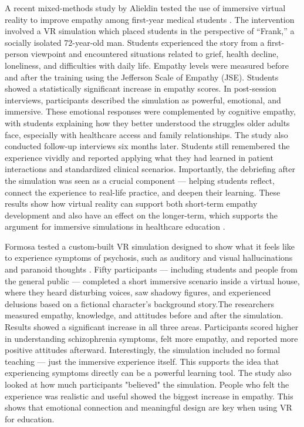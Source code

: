 A recent mixed-methods study by Alieldin \cite{Alieldin2024} tested the use of immersive virtual reality to improve empathy among first-year medical students \cite{Alieldin2024}. The intervention involved a VR simulation which placed students in the perspective of “Frank,” a socially isolated 72-year-old man. Students experienced the story from a first-person viewpoint and encountered situations related to grief, health decline, loneliness, and difficulties with daily life. Empathy levels were measured before and after the training using the Jefferson Scale of Empathy (JSE). Students showed a statistically significant increase in empathy scores. In post-session interviews, participants described the simulation as powerful, emotional, and immersive. These emotional responses were complemented by cognitive empathy, with students explaining how they better understood the struggles older adults face, especially with healthcare access and family relationships. The study also conducted follow-up interviews six months later. Students still remembered the experience vividly and reported applying what they had learned in patient interactions and standardized clinical scenarios. Importantly, the debriefing after the simulation was seen as a crucial component — helping students reflect, connect the experience to real-life practice, and deepen their learning. These results show how virtual reality can support both short-term empathy development and also have an effect on the longer-term, which supports the argument for immersive simulations in healthcare education \cite{Alieldin2024}.

\vspace{1em}

Formosa \cite{Formosa2018} tested a custom-built VR simulation designed to show what it feels like to experience symptoms of psychosis, such as auditory and visual hallucinations and paranoid thoughts \cite{Formosa2018}. Fifty participants — including students and people from the general public — completed a short immersive scenario inside a virtual house, where they heard disturbing voices, saw shadowy figures, and experienced delusions based on a fictional character’s background story.The researchers measured empathy, knowledge, and attitudes before and after the simulation. Results showed a significant increase in all three areas. Participants scored higher in understanding schizophrenia symptoms, felt more empathy, and reported more positive attitudes afterward. Interestingly, the simulation included no formal teaching — just the immersive experience itself. This supports the idea that experiencing symptoms directly can be a powerful learning tool. The study also looked at how much participants "believed" the simulation. People who felt the experience was realistic and useful showed the biggest increase in empathy. This shows that emotional connection and meaningful design are key when using VR for education. 

